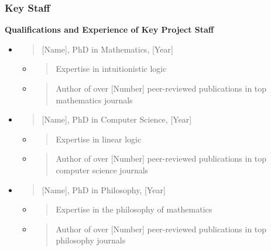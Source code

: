 \hypertarget{key-staff}{%
\subsubsection{Key Staff}\label{key-staff}}

\textbf{Qualifications and Experience of Key Project Staff}

\begin{itemize}
\item
  \begin{quote}
  {[}Name{]}, PhD in Mathematics, {[}Year{]}
  \end{quote}

  \begin{itemize}
  \item
    \begin{quote}
    Expertise in intuitionistic logic
    \end{quote}
  \item
    \begin{quote}
    Author of over {[}Number{]} peer-reviewed publications in top
    mathematics journals
    \end{quote}
  \end{itemize}
\item
  \begin{quote}
  {[}Name{]}, PhD in Computer Science, {[}Year{]}
  \end{quote}

  \begin{itemize}
  \item
    \begin{quote}
    Expertise in linear logic
    \end{quote}
  \item
    \begin{quote}
    Author of over {[}Number{]} peer-reviewed publications in top
    computer science journals
    \end{quote}
  \end{itemize}
\item
  \begin{quote}
  {[}Name{]}, PhD in Philosophy, {[}Year{]}
  \end{quote}

  \begin{itemize}
  \item
    \begin{quote}
    Expertise in the philosophy of mathematics
    \end{quote}
  \item
    \begin{quote}
    Author of over {[}Number{]} peer-reviewed publications in top
    philosophy journals
    \end{quote}
  \end{itemize}
\end{itemize}

